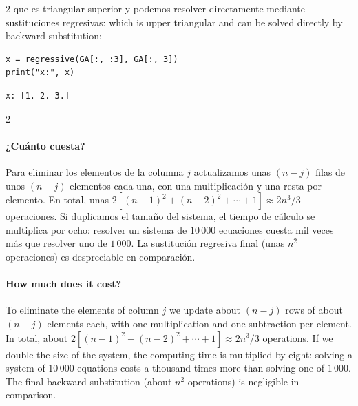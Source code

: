 \begin{paracol}{2}
que es triangular superior y podemos resolver directamente mediante sustituciones regresivas:
\switchcolumn
which is upper triangular and can be solved directly by backward substitution:
\end{paracol}

\begin{verbatim}
x = regressive(GA[:, :3], GA[:, 3])
print("x:", x)
\end{verbatim}

\begin{verbatim}
x: [1. 2. 3.]
\end{verbatim}

\begin{paracol}{2}
\paragraph{¿Cuánto cuesta?} Para eliminar los elementos de la columna $j$ actualizamos unas $(n-j)$ filas de unos $(n-j)$ elementos cada una, con una multiplicación y una resta por elemento. En total, unas $2\left[(n-1)^2+(n-2)^2+\cdots+1\right]\approx 2n^3/3$ operaciones. Si duplicamos el tamaño del sistema, el tiempo de cálculo se multiplica por ocho: resolver un sistema de $10\,000$ ecuaciones cuesta mil veces más que resolver uno de $1\,000$. La sustitución regresiva final (unas $n^2$ operaciones) es despreciable en comparación.

\switchcolumn
\paragraph{How much does it cost?} To eliminate the elements of column $j$ we update about $(n-j)$ rows of about $(n-j)$ elements each, with one multiplication and one subtraction per element. In total, about $2\left[(n-1)^2+(n-2)^2+\cdots+1\right]\approx 2n^3/3$ operations. If we double the size of the system, the computing time is multiplied by eight: solving a system of $10\,000$ equations costs a thousand times more than solving one of $1\,000$. The final backward substitution (about $n^2$ operations) is negligible in comparison.
\end{paracol}

